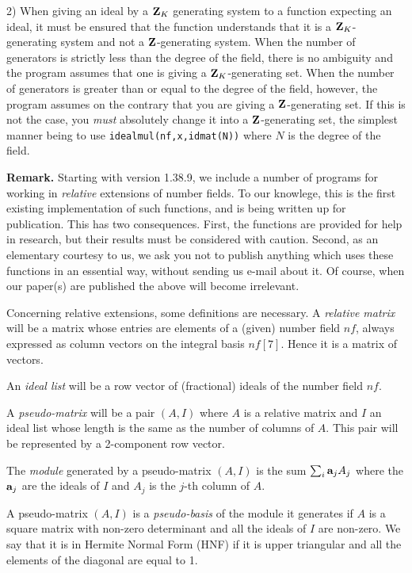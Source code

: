 2) When giving an ideal by a ${\bf Z}_K$ generating system to a function 
expecting an ideal, it must be ensured that the function understands 
that it is a ${\bf Z}_K$-generating system and not a ${\bf Z}$-generating system.
When the number of generators is strictly less than the degree of the
field, there is no ambiguity and the program assumes that one is
giving a ${\bf Z}_K$-generating set. When the number of generators is greater
than or equal to the degree of the field, however, the program assumes
on the contrary that you are giving a ${\bf Z}$-generating set. If this is
not the case, you {\it must\/} absolutely change it into a ${\bf Z}$-generating
set, the simplest manner being to use {\tt idealmul(nf,x,idmat(N))}
where $N$ is the degree of the field.

{\bf Remark.} Starting with version 1.38.9, we include a number of 
programs for working in {\it relative\/} extensions of number fields. To
our knowlege, this is the first existing implementation of such 
functions, and is being written up for publication. This has two 
consequences. First, the functions are provided for help in research,
but their results must be considered with caution. Second, as an
elementary courtesy to us, we ask you not to publish anything which
uses these functions in an essential way, without sending us e-mail
about it. Of course, when our paper(s) are published the above will
become irrelevant.

Concerning relative extensions, some definitions are necessary. 
A {\it relative matrix\/} will be a matrix whose entries are elements
of a (given) number field $nf$, always expressed as column vectors on
the integral basis $nf[7]$. Hence it is a matrix of vectors.

An {\it ideal list\/} will be a row vector of (fractional) ideals of the
number field $nf$.

A {\it pseudo-matrix\/} will be a pair $(A,I)$ where $A$ is a relative
matrix and $I$ an ideal list whose length is the same as the number of
columns of $A$. This pair will be represented by a 2-component row vector.

The {\it module\/} generated by a pseudo-matrix $(A,I)$ is the sum
$\sum_i{\bf a}_jA_j$ where the ${\bf a}_j$ are the ideals of $I$ and $A_j$ is the
$j$-th column of $A$.

A pseudo-matrix $(A,I)$ is a {\it pseudo-basis} of the module it
generates if $A$ is a square matrix with non-zero determinant and all
the ideals of $I$ are non-zero. We say that it is in Hermite Normal
Form (HNF) if it is upper triangular and all the elements of the
diagonal are equal to 1.

